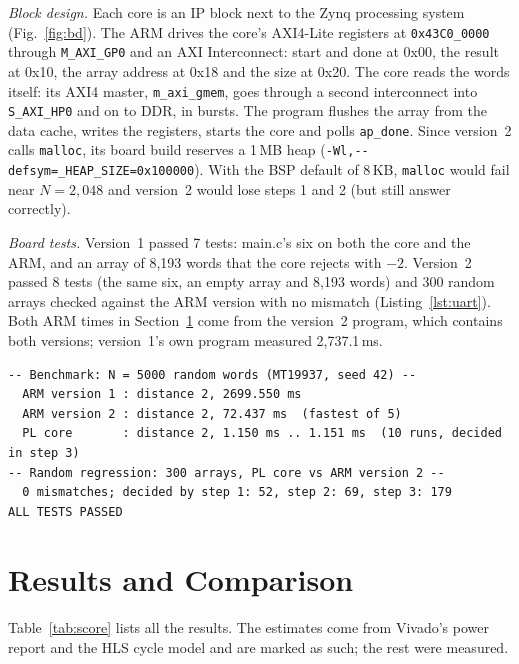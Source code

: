 \documentclass[conference,a4paper]{IEEEtran}
\newcommand{\code}[1]{\texttt{#1}}
\begin{document}
\emph{Block design.} Each core is an IP block next to the Zynq processing
system~\cite{ug585} (Fig.~\ref{fig:bd}). The ARM drives the core's AXI4-Lite
registers at \code{0x43C0\_0000} through \code{M\_AXI\_GP0} and an AXI
Interconnect: start and done at 0x00, the result at 0x10, the array address at
0x18 and the size at 0x20. The core reads the words itself: its AXI4 master,
\code{m\_axi\_gmem}, goes through a second interconnect into \code{S\_AXI\_HP0}
and on to DDR, in bursts. The program flushes the array from the data cache,
writes the registers, starts the core and polls \code{ap\_done}. Since
version~2 calls \code{malloc}, its board build reserves a 1\,MB heap
(\code{-Wl,-{}-defsym=\_HEAP\_SIZE=0x100000}). With the BSP default of 8\,KB,
\code{malloc} would fail near $N=2{,}048$ and version~2 would lose steps 1 and 2
(but still answer correctly).

\emph{Board tests.} Version~1 passed 7 tests: main.c's six on both the core and
the ARM, and an array of 8,193 words that the core rejects with $-2$.
Version~2 passed 8 tests (the same six, an empty array and 8,193 words) and 300
random arrays checked against the ARM version with no mismatch
(Listing~\ref{lst:uart}). Both ARM times in Section~\ref{sec:results} come from
the version~2 program, which contains both versions; version~1's own program
measured 2,737.1\,ms.

\begin{lstlisting}[float=t,language={},numbers=none,xleftmargin=0pt,basicstyle=\ttfamily\fontsize{6}{7}\selectfont,caption={UART output of the version 2 board program (excerpt)},label={lst:uart}]
-- Benchmark: N = 5000 random words (MT19937, seed 42) --
  ARM version 1 : distance 2, 2699.550 ms
  ARM version 2 : distance 2, 72.437 ms  (fastest of 5)
  PL core       : distance 2, 1.150 ms .. 1.151 ms  (10 runs, decided in step 3)
-- Random regression: 300 arrays, PL core vs ARM version 2 --
  0 mismatches; decided by step 1: 52, step 2: 69, step 3: 179
ALL TESTS PASSED
\end{lstlisting}

\section{Results and Comparison}
\label{sec:results}
Table~\ref{tab:score} lists all the results. The estimates come from Vivado's
power report and the HLS cycle model and are marked as such; the rest were
measured.
\end{document}
